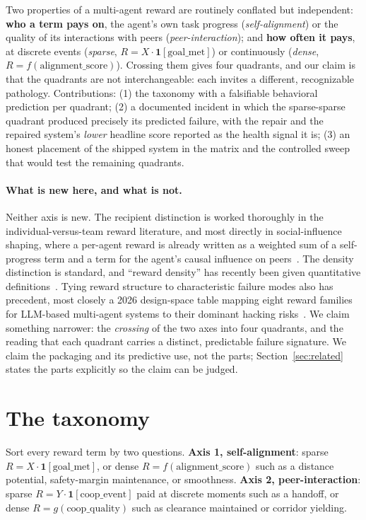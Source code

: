 \documentclass[11pt]{article}
\begin{document}
Two properties of a multi-agent reward are routinely conflated but independent: \textbf{who a term pays on}, the agent's own task progress (\emph{self-alignment}) or the quality of its interactions with peers (\emph{peer-interaction}); and \textbf{how often it pays}, at discrete events (\emph{sparse}, $R = X\cdot\mathbf{1}[\text{goal\_met}]$) or continuously (\emph{dense}, $R = f(\text{alignment\_score})$). Crossing them gives four quadrants, and our claim is that the quadrants are not interchangeable: each invites a different, recognizable pathology. Contributions: (1) the taxonomy with a falsifiable behavioral prediction per quadrant; (2) a documented incident in which the sparse-sparse quadrant produced precisely its predicted failure, with the repair and the repaired system's \emph{lower} headline score reported as the health signal it is; (3) an honest placement of the shipped system in the matrix and the controlled sweep that would test the remaining quadrants.

\paragraph{What is new here, and what is not.} Neither axis is new. The recipient distinction is worked thoroughly in the individual-versus-team reward literature, and most directly in social-influence shaping, where a per-agent reward is already written as a weighted sum of a self-progress term and a term for the agent's causal influence on peers~\cite{jaques}. The density distinction is standard, and ``reward density'' has recently been given quantitative definitions~\cite{practitioner,acl2026}. Tying reward structure to characteristic failure modes also has precedent, most closely a 2026 design-space table mapping eight reward families for LLM-based multi-agent systems to their dominant hacking risks~\cite{orch}. We claim something narrower: the \emph{crossing} of the two axes into four quadrants, and the reading that each quadrant carries a distinct, predictable failure signature. We claim the packaging and its predictive use, not the parts; Section~\ref{sec:related} states the parts explicitly so the claim can be judged.

\section{The taxonomy}
Sort every reward term by two questions. \textbf{Axis 1, self-alignment}: sparse $R = X\cdot\mathbf{1}[\text{goal\_met}]$, or dense $R = f(\text{alignment\_score})$ such as a distance potential, safety-margin maintenance, or smoothness. \textbf{Axis 2, peer-interaction}: sparse $R = Y\cdot\mathbf{1}[\text{coop\_event}]$ paid at discrete moments such as a handoff, or dense $R = g(\text{coop\_quality})$ such as clearance maintained or corridor yielding.
\end{document}
